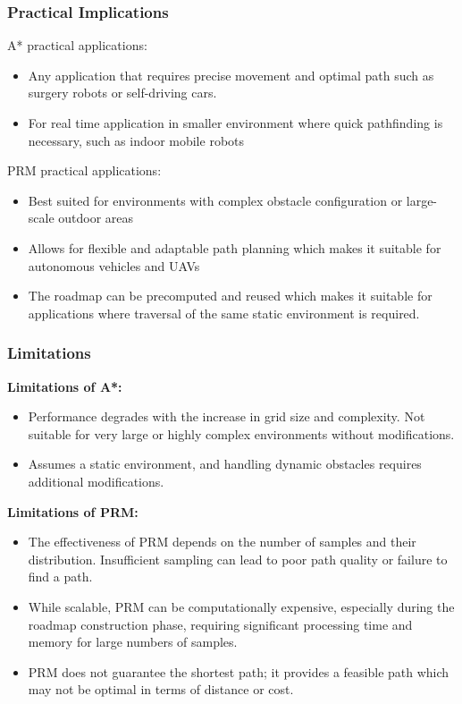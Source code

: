 \documentclass[9pt,a4paper,twoside]{rho-class/rho}
\begin{document}
\subsubsection{Practical Implications}

A* practical applications:
\begin{itemize}
    \item Any application that requires precise movement and optimal path such as surgery robots or self-driving cars.
    \item For real time application in smaller environment where quick pathfinding is necessary, such as indoor mobile robots
\end{itemize}

PRM practical applications:  
\begin{itemize}
    \item Best suited for environments with complex obstacle configuration or large-scale outdoor areas
    \item Allows for flexible and adaptable path planning which makes it suitable for autonomous vehicles and UAVs
    \item The roadmap can be precomputed and reused which makes it suitable for applications where traversal of the same static environment is required.
\end{itemize}

\subsubsection{Limitations}

 \textbf{Limitations of A*:}
\begin{itemize}
    \item Performance degrades with the increase in grid size and complexity. Not suitable for very large or highly complex environments without modifications.
    \item Assumes a static environment, and handling dynamic obstacles requires additional modifications.
\end{itemize}

 \textbf{Limitations of PRM:}
\begin{itemize}
    \item The effectiveness of PRM depends on the number of samples and their distribution. Insufficient sampling can lead to poor path quality or failure to find a path.
    \item While scalable, PRM can be computationally expensive, especially during the roadmap construction phase, requiring significant processing time and memory for large numbers of samples.
    \item PRM does not guarantee the shortest path; it provides a feasible path which may not be optimal in terms of distance or cost.
\end{itemize}
\end{document}
